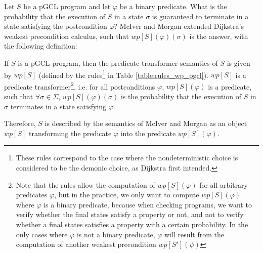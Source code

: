 \documentclass[a4paper,10pt]{llncs}
\begin{document}
    Let $S$ be a pGCL program and let $\varphi$ be a binary predicate.
	What is the probability that the execution of $S$ in a state $\sigma$ is guaranteed to terminate in a state satisfying the postcondition $\varphi$? McIver and Morgan extended Dijkstra's weakest precondition calculus, such that $wp[S](\varphi)(\sigma)$ is the answer, with the following definition:
	\begin{definition}
	If $S$ is a pGCL program, then the predicate transformer semantics of $S$ is given by $wp[S]$ (defined by the rules\footnote{These rules correspond to the case where the nondeterministic choice is considered to be the demonic choice, as Dijkstra first intended.} in Table \ref{table:rules_wp_pgcl}).\newline
	$wp[S]$ is a predicate transformer\footnote{Note that the rules allow the computation of $wp[S](\varphi)$ for all arbitrary predicates $\varphi$, but in the practice, we only want to compute $wp[S](\varphi)$ where $\varphi$ is a binary predicate, because when checking programs, we want to verify whether the final states satisfy a property or not, and not to verify whether a final states satisfies a property with a certain probability. In the only cases where $\varphi$ is not a binary predicate, $\varphi$ will result from the computation of another weakest precondition $wp[S'](\psi)$
	}, i.e. for all postconditions $\varphi$, $wp[S](\varphi)$ is a predicate, such that $\forall \sigma \in \Sigma$, $wp[S](\varphi)(\sigma)$ is the probability that the execution of $S$ in $\sigma$ terminates in a state satisfying $\varphi$.
	\end{definition}
	Therefore, $S$ is described by the semantics of McIver and Morgan as an object $wp[S]$ transforming the predicate $\varphi$ into the predicate $wp[S](\varphi)$.
	
\end{document}
